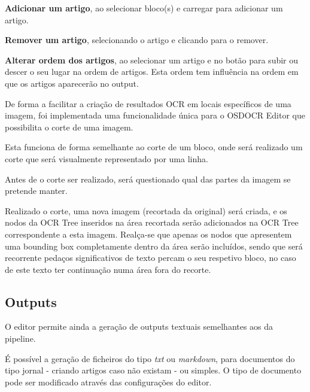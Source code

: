 

\textbf{Adicionar um artigo}, ao selecionar bloco(s) e carregar para adicionar um artigo.


\textbf{Remover um artigo}, selecionando o artigo e clicando para o remover.


\textbf{Alterar ordem dos artigos}, ao selecionar um artigo e no botão para subir ou descer o seu lugar na ordem de artigos. Esta ordem tem influência na ordem em que os artigos aparecerão no output.




De forma a facilitar a criação de resultados OCR em locais específicos de uma imagem, foi implementada uma funcionalidade única para o OSDOCR Editor que possibilita o corte de uma imagem.

Esta funciona de forma semelhante ao corte de um bloco, onde será realizado um corte que será visualmente representado por uma linha.


Antes de o corte ser realizado, será questionado qual das partes da imagem se pretende manter.

Realizado o corte, uma nova imagem (recortada da original) será criada, e os nodos da OCR Tree inseridos na área recortada serão adicionados na OCR Tree correspondente a esta imagem. Realça-se que apenas os nodos que apresentem uma bounding box completamente dentro da área serão incluídos, sendo que será recorrente pedaços significativos de texto percam o seu respetivo bloco, no caso de este texto ter continuação numa área fora do recorte.



\subsection{Outputs}

O editor permite ainda a geração de outputs textuais semelhantes aos da pipeline. 

É possível a geração de ficheiros do tipo \textit{txt} ou \textit{markdown}, para documentos do tipo jornal - criando artigos caso não existam - ou simples. O tipo de documento pode ser modificado através das configurações do editor.


